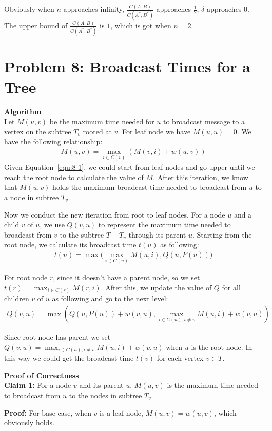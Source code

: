 \documentclass{article}
\newcommand{\Proof}{\vspace{0.3cm} \noindent\textbf{Proof of Correctness} \vspace{0.2cm} \\}
\newcommand{\Algorithm}{\textbf{Algorithm} \vspace{0.2cm}\\}
\begin{document}
Obviously when $n$ approaches infinity, $\frac{C(A, B)}{C(A^*, B^*)}$ approaches $\frac{1}{2}$,
$\delta$ approaches $0$. The upper bound of $\frac{C(A, B)}{C(A^*, B^*)}$ is $1$, which is got when
$n = 2$.


\section*{Problem 8: Broadcast Times for a Tree}
\Algorithm
Let $M(u, v)$ be the maximum time needed for $u$ to broadcast message to a vertex on the subtree   
$T_v$ rooted at $v$. For leaf node we have $M(u, u) = 0$. We have the
following relationship:
\begin{align}
  M(u, v) = \max_{i \in C(v)} (M(v, i) + w(u, v))
  \label{equ:8-1}
\end{align}
Given Equation~\ref{equ:8-1}, we could start from leaf nodes and go upper until we reach the root
node to calculate the value of $M$. After this iteration, we know that $M(u, v)$ holds the maximum
broadcast time needed to broadcast from $u$ to a node in subtree $T_v$.

Now we conduct the new iteration from root to leaf nodes. For a node $u$ and a child $v$ of $u$, 
we use $Q(v, u)$  to represent the maximum time needed to broadcast from $v$ to the subtree $T -
T_v$ through its parent $u$. Starting from the root node, we calculate its broadcast time $t(u)$ as following:
\begin{align}
  t(u) = \max\big(\max_{i \in C(u)} M(u, i), Q(u, P(u)) \big)
\end{align}

For root node $r$, since it doesn't have a parent node, so we set $t(r) =  \max_{i \in C(r)} M(r, i)$.
After this, we update the value of $Q$ for all children $v$ of $u$ as following and go to the next
level:
\begin{align}
  Q(v, u) = \max(Q(u, P(u))  + w(v, u), \max_{i \in C(u), i \neq v} M(u, i) + w(v, u))  
  \label{equ:8-2}
\end{align}

Since root node has parent we set $Q(v, u) =  \max_{i \in C(u), i \neq v} M(u, i) + w(v, u)$ when
$u$ is the root node.  
In this way we could get the broadcast time $t(v)$ for each vertex $v \in T$.

\Proof
\textbf{Claim 1:} 
For a node $v$ and its parent $u$, $M(u, v)$ is the maximum time needed to broadcast from $u$ to the
nodes in subtree $T_v$.

\textbf{Proof:} 
For base case, when $v$ is a leaf node,  $M(u, v) = w(u, v)$, which obviously holds.
\end{document}

